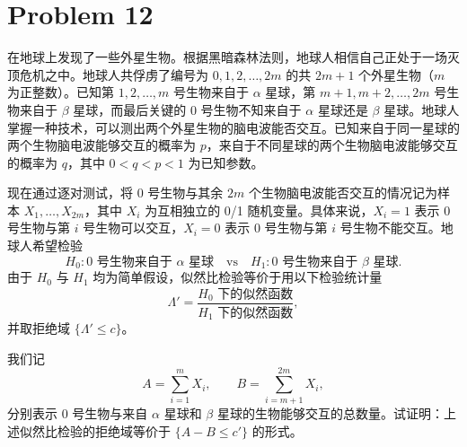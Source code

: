 \documentclass[12pt,a4paper]{article}
\begin{document}
\section{Problem 12}

在地球上发现了一些外星生物。根据黑暗森林法则，地球人相信自己正处于一场灭顶危机之中。地球人共俘虏了编号为 $0,1,2,\ldots,2m$ 的共 $2m+1$ 个外星生物（$m$ 为正整数）。已知第 $1,2,\ldots,m$ 号生物来自于 $\alpha$ 星球，第 $m+1,m+2,\ldots,2m$ 号生物来自于 $\beta$ 星球，而最后关键的 0 号生物不知来自于 $\alpha$ 星球还是 $\beta$ 星球。地球人掌握一种技术，可以测出两个外星生物的脑电波能否交互。已知来自于同一星球的两个生物脑电波能够交互的概率为 $p$，来自于不同星球的两个生物脑电波能够交互的概率为 $q$，其中 $0<q<p<1$ 为已知参数。

现在通过逐对测试，将 0 号生物与其余 $2m$ 个生物脑电波能否交互的情况记为样本 $X_1,\ldots,X_{2m}$，其中 $X_i$ 为互相独立的 0/1 随机变量。具体来说，$X_i=1$ 表示 0 号生物与第 $i$ 号生物可以交互，$X_i=0$ 表示 0 号生物与第 $i$ 号生物不能交互。地球人希望检验
\[
  H_0:\text{0 号生物来自于 }\alpha\text{ 星球}
  \quad \text{vs}\quad
  H_1:\text{0 号生物来自于 }\beta\text{ 星球}.
\]
由于 $H_0$ 与 $H_1$ 均为简单假设，似然比检验等价于用以下检验统计量
\[
  \Lambda'=
  \frac{H_0\text{ 下的似然函数}}{H_1\text{ 下的似然函数}},
\]
并取拒绝域 $\{\Lambda'\le c\}$。

我们记
\[
  A=\sum_{i=1}^{m}X_i,\qquad B=\sum_{i=m+1}^{2m}X_i,
\]
分别表示 0 号生物与来自 $\alpha$ 星球和 $\beta$ 星球的生物能够交互的总数量。试证明：上述似然比检验的拒绝域等价于 $\{A-B\le c'\}$ 的形式。
\end{document}
